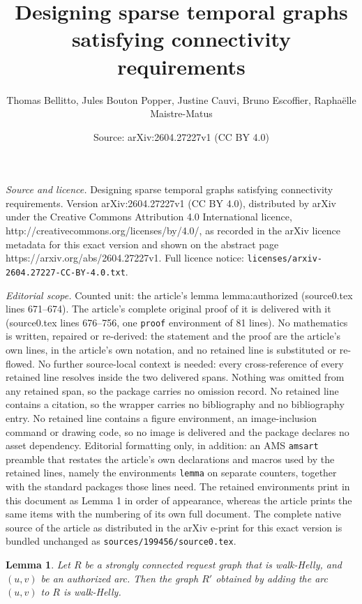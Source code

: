 \documentclass[10pt,a4paper]{amsart}
\title{Designing sparse temporal graphs satisfying connectivity requirements}
\author{Thomas Bellitto, Jules Bouton Popper, Justine Cauvi, Bruno Escoffier, Rapha\"elle Maistre-Matus}
\date{Source: arXiv:2604.27227v1 (CC BY 4.0)}
\newtheorem{lemma}{Lemma}
\begin{document}
\maketitle

\noindent\emph{Source and licence.} Designing sparse temporal graphs satisfying connectivity requirements. Version arXiv:2604.27227v1 (CC BY 4.0), distributed by arXiv under the Creative Commons Attribution 4.0 International licence, http://creativecommons.org/licenses/by/4.0/, as recorded in the arXiv licence metadata for this exact version and shown on the abstract page https://arxiv.org/abs/2604.27227v1. Full licence notice: \texttt{licenses/arxiv-2604.27227-CC-BY-4.0.txt}.\par\smallskip

\noindent\textit{Editorial scope.} Counted unit: the article's lemma lemma:authorized (source0.tex lines 671--674). The article's complete original proof of it is delivered with it (source0.tex lines 676--756, one \texttt{proof} environment of 81 lines). No mathematics is written, repaired or re-derived: the statement and the proof are the article's own lines, in the article's own notation, and no retained line is substituted or re-flowed.  No further source-local context is needed: every cross-reference of every retained line resolves inside the two delivered spans.  Nothing was omitted from any retained span, so the package carries no omission record.  No retained line contains a citation, so the wrapper carries no bibliography and no bibliography entry.  No retained line contains a figure environment, an image-inclusion command or drawing code, so no image is delivered and the package declares no asset dependency.  Editorial formatting only, in addition: an AMS \texttt{amsart} preamble that restates the article's own declarations and macros used by the retained lines, namely the environments \texttt{lemma} on separate counters, together with the standard packages those lines need.  The retained environments print in this document as Lemma 1 in order of appearance, whereas the article prints the same items with the numbering of its own full document.  The complete native source of the article as distributed in the arXiv e-print for this exact version is bundled unchanged as \texttt{sources/199456/source0.tex}.
\begin{lemma}
\label{lemma:authorized}
Let $R$ be a strongly connected request graph that is walk-Helly, and $(u,v)$ be an authorized arc. Then the graph $R'$ obtained by adding the arc $(u,v)$ to $R$ is walk-Helly.  
\end{lemma}
\end{document}

